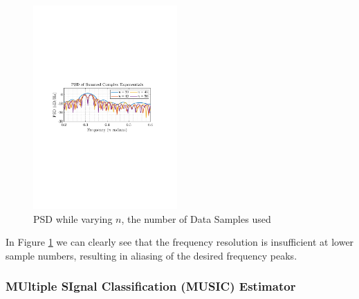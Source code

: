 \documentclass[12pt]{article}
\begin{document}
	\begin{figure}[H]%
		\centering
			\includegraphics[trim={2.2cm 11.2cm 3.15cm  11.2cm}, clip, width=0.49\textwidth]{../MATLAB/figures/q1_3d_fig01.pdf} 
	\captionsetup{justification=centering}
	\caption{PSD while varying $n$, the number of Data Samples used}
	\label{fig: 1-3d}
	\end{figure}
	
	In Figure \ref{fig: 1-3d} we can clearly see that the frequency resolution is insufficient at lower sample numbers, resulting in aliasing of the desired frequency peaks.
	
	\subsubsection{MUltiple SIgnal Classification (MUSIC) Estimator}
	
\end{document}
